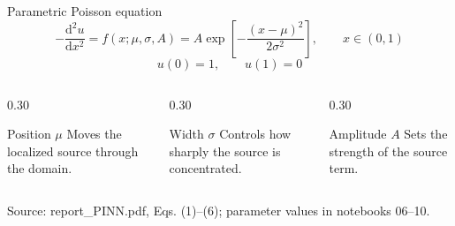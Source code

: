 \documentclass[aspectratio=169,xcolor=dvipsnames,11pt]{beamer}
\newcommand{\src}[1]{%
  \vfill
  {\color{MidGray}\fontsize{6.5}{7.5}\selectfont Source: #1\par}
}
\begin{document}
\begin{frame}{Parametric Poisson equation}
  \centering
  {\Large
  \[
    -\frac{\mathrm d^2 u}{\mathrm d x^2}
      = f(x;\mu,\sigma,A)
      = A\exp\!\left[-\frac{(x-\mu)^2}{2\sigma^2}\right],
      \qquad x\in(0,1)
  \]
  \[
    u(0)=1,
    \qquad
    u(1)=0
  \]
  }
  \vspace{0.5em}
  \begin{columns}[T,onlytextwidth]
    \begin{column}{0.30\textwidth}
      \begin{block}{Position $\mu$}
        Moves the localized source through the domain.
      \end{block}
    \end{column}
    \begin{column}{0.30\textwidth}
      \begin{block}{Width $\sigma$}
        Controls how sharply the source is concentrated.
      \end{block}
    \end{column}
    \begin{column}{0.30\textwidth}
      \begin{block}{Amplitude $A$}
        Sets the strength of the source term.
      \end{block}
    \end{column}
  \end{columns}
  \src{report\_PINN.pdf, Eqs. (1)--(6); parameter values in notebooks 06--10.}
\end{frame}
\end{document}
